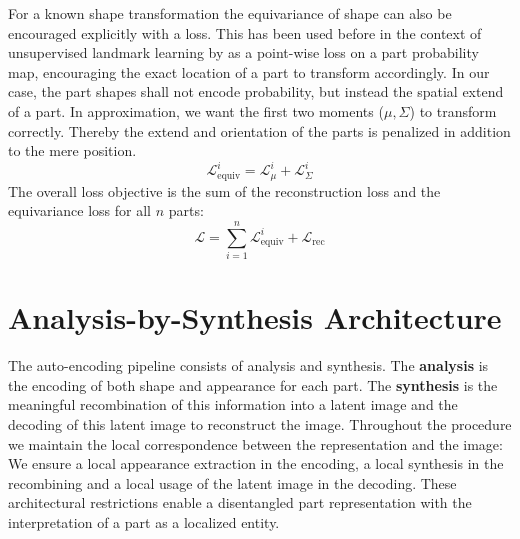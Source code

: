 	For a known shape transformation the equivariance of shape can also be encouraged explicitly with a loss. This has been used before in the context of unsupervised landmark learning by \cite{thewlis17, zhang18} as a point-wise loss on a part probability map, encouraging the exact location of a part to transform accordingly. In our case, the part shapes shall not encode probability, but instead the spatial extend of a part. In approximation, we want the first two moments ($\mu, \Sigma$) to transform correctly. Thereby the extend and orientation of the parts is penalized in addition to the mere position.
	\begin{equation}
	\mathcal{L}_{\textrm{equiv}}^i = \mathcal{L}_{\mu}^i+ \mathcal{L}_{\Sigma}^i
	\label{covariance}
	\end{equation}
	The overall loss objective is the sum of the reconstruction loss and the equivariance loss for all $n$ parts:
	\begin{equation}
	\mathcal{L} = \sum_{i=1}^n \mathcal{L}_{\text{equiv}}^i + \mathcal{L}_{\textrm{rec}}
	\end{equation}


\section{Analysis-by-Synthesis Architecture}\label{sec:architecture}
	The auto-encoding pipeline consists of analysis and synthesis. The \textbf{analysis} is the {encoding} of both shape and appearance for each part. The \textbf{synthesis} is the meaningful {recombination} of this information into a latent image and the {decoding} of this latent image to reconstruct the image. %
	Throughout the procedure we maintain the local correspondence between the representation and the image: We ensure a local appearance extraction in the encoding, a local synthesis in the recombining and a local usage of the latent image in the decoding. These architectural restrictions enable a disentangled part representation with the interpretation of a part as a localized entity. \\

